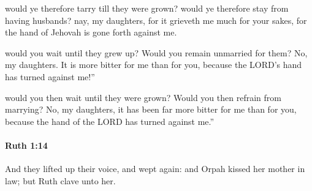 			\begin{versebox}
					\item[BHS] 
					\item[LXX] 
					\item[ASV] would ye therefore tarry till they were grown? would ye therefore stay from having husbands? nay, my daughters, for it grieveth me much for your sakes, for the hand of Jehovah is gone forth against me.
					\item[NIV] would you wait until they grew up? Would you remain unmarried for them? No, my daughters. It is more bitter for me than for you, because the LORD’s hand has turned against me!”
					\item[NRSV] would you then wait until they were grown? Would you then refrain from marrying? No, my daughters, it has been far more bitter for me than for you, because the hand of the LORD has turned against me.”
			\end{versebox}

		\paragraph{Ruth 1:14} %
			\label{RUTH-1-14}

			And they lifted up their voice, and wept again: and Orpah kissed her mother in law; but Ruth clave unto her.


